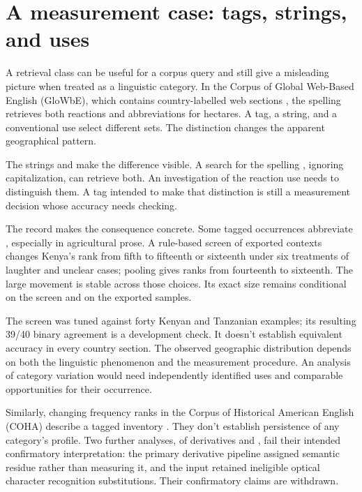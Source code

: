 \documentclass[12pt]{article}
\begin{document}
\section{A measurement case: tags, strings, and uses}\label{sec:evidence}

A retrieval class can be useful for a corpus query and still give
a misleading picture when treated as a linguistic category. In the
Corpus of Global Web-Based English (GloWbE), which contains country-labelled
web sections \citep{daviesfuchs2015}, the spelling  retrieves
both reactions and abbreviations for hectares. A tag, a string, and
a conventional use select different sets. The distinction changes the
apparent geographical pattern.

The strings  and  make the difference visible. A search for the spelling
, ignoring capitalization, can retrieve both. An investigation
of the reaction use needs to distinguish them. A tag intended to
make that distinction is still a measurement decision whose accuracy
needs checking.

The  record makes the consequence concrete. Some tagged
occurrences abbreviate , especially in agricultural prose.
A rule-based screen of exported contexts changes Kenya's rank from fifth
to fifteenth or sixteenth under six treatments of laughter and unclear
cases; pooling gives ranks from fourteenth to sixteenth. The large
movement is stable across those choices. Its exact size remains
conditional on the screen and on the exported samples.

The screen was tuned against forty Kenyan and Tanzanian examples;
its resulting 39/40 binary agreement is a development check. It doesn't
establish equivalent accuracy in every country section. The observed
geographic distribution depends on both the linguistic
phenomenon and the measurement procedure. An analysis of category
variation would need independently identified uses and comparable
opportunities for their occurrence.

Similarly, changing frequency ranks in the Corpus of Historical American
English (COHA) describe a tagged inventory \citep{davies2010}.
They don't establish persistence of any category's profile.
Two further analyses, of derivatives and , fail their
intended confirmatory interpretation: the primary derivative pipeline
assigned semantic residue rather than measuring it, and the 
input retained ineligible optical character recognition substitutions.
Their confirmatory claims are withdrawn.
\end{document}

